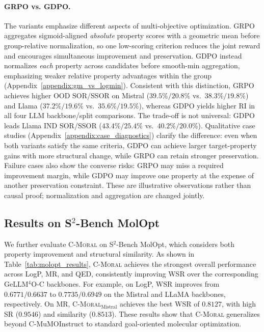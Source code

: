 \documentclass[11pt]{article}
\begin{document}
\paragraph{GRPO vs. GDPO.}
The variants emphasize different aspects of multi-objective
optimization. GRPO aggregates sigmoid-aligned \emph{absolute}
property scores with a geometric mean before group-relative
normalization, so one low-scoring criterion reduces the joint
reward and encourages simultaneous improvement and preservation.
GDPO instead normalizes \emph{each} property across candidates
before smooth-min aggregation, emphasizing weaker relative
property advantages within the group
(Appendix~\ref{appendix:gm_vs_logmin}).
Consistent with this distinction, GRPO achieves higher OOD
SOR/SSOR on Mistral ($39.5\%/20.8\%$ vs.\
$38.3\%/19.8\%$) and Llama ($37.2\%/19.6\%$ vs.\
$35.6\%/19.5\%$), whereas GDPO yields higher RI
in all four LLM backbone/split comparisons.
The trade-off is not universal: GDPO leads Llama IND
SOR/SSOR ($43.4\%/25.4\%$ vs.\ $40.2\%/20.0\%$).
Qualitative case studies
(Appendix~\ref{appendix:case_diagnostics}) clarify the
difference: even when both variants satisfy the same criteria,
GDPO can achieve larger target-property gains with more
structural change, while GRPO can retain stronger preservation.
Failure cases also show the converse risks: GRPO may miss a
required improvement margin, while GDPO may improve one
property at the expense of another preservation constraint.
These are illustrative observations rather than causal proof;
normalization and aggregation are changed jointly.

\subsection{Results on S$^2$-Bench MolOpt}

We further evaluate \textsc{C-Moral} on S$^2$-Bench MolOpt, which considers both property improvement and structural similarity. As shown in Table~\ref{tab:molopt_results}, \textsc{C-Moral} achieves the strongest overall performance across LogP, MR, and QED, consistently improving WSR over the corresponding GeLLM$^4$O-C backbones. For example, on LogP, WSR improves from $0.6771/0.6637$ to $0.7735/0.6949$ on the Mistral and LLaMA backbones, respectively. On MR, \textsc{C-Moral}$_{\text{Mistral}}$ achieves the best WSR of $0.8127$, with high SR ($0.9546$) and similarity ($0.8513$). These results show that \textsc{C-Moral} generalizes beyond C-MuMOInstruct to standard goal-oriented molecular optimization.
\end{document}
